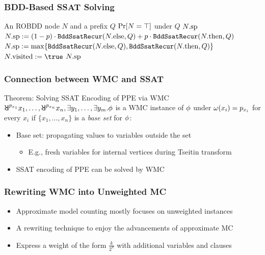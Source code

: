\begin{frame}
  \frametitle{BDD-Based SSAT Solving}
  {
    \small
    \begin{algorithmic}[1]
      \REQUIRE An ROBDD node $N$ and a prefix $Q$
      \ENSURE $\Pr[N=\top]$ under $Q$
      \label{code:bddssat-recursive-constant-start}
      \RETURN $N.\mathrm{sp}$\label{code:bddssat-recursive-constant-end}
      \ENDIF
      \alert{\STATE $N.\mathrm{sp}:=(1-p)\cdot\texttt{BddSsatRecur}(N.\mathrm{else},Q)+p\cdot\texttt{BddSsatRecur}(N.\mathrm{then},Q)$}
      \label{code:bddssat-recursive-random}
      \ELSE
      \alert{\STATE $N.\mathrm{sp}:=\max\{\texttt{BddSsatRecur}(N.\mathrm{else},Q),\texttt{BddSsatRecur}(N.\mathrm{then},Q)\}$}
      \label{code:bddssat-recursive-exist}
      \ENDIF
      \STATE $\nodevisit{N} := \true$
      \ENDIF
      \RETURN $N.\mathrm{sp}$
    \end{algorithmic}
  }
\end{frame}

\begin{frame}
  \frametitle{Connection between WMC and SSAT}
  \begin{block}{Theorem: Solving SSAT Encoding of PPE via WMC}
    $\random{p_{x_1}}x_1,\ldots,\random{p_{x_n}}x_n,\exists y_1,\ldots,\exists y_m.\pf$ is
    a WMC instance of $\phi$ under $\omega(x_i)=p_{x_i}$ for every $x_i$
    if $\{x_1,\ldots,x_n\}$ is a \textit{base set} for $\phi$:
    \pause
    \begin{itemize}
      \item Base set: propagating values to variables outside the set
            \pause
            \begin{itemize}
              \item E.g., fresh variables for internal vertices during Tseitin transform
                    \pause
            \end{itemize}
      \item SSAT encoding of PPE can be solved by WMC
    \end{itemize}
  \end{block}
\end{frame}

\begin{frame}
  \frametitle{Rewriting WMC into Unweighted MC}
  \begin{itemize}
    \item Approximate model counting mostly focuses on unweighted instances
          \pause
    \item A rewriting technique to enjoy the advancements of approximate MC
          \pause
    \item Express a weight of the form $\frac{k}{2^n}$ with additional variables and clauses
  \end{itemize}
\end{frame}

